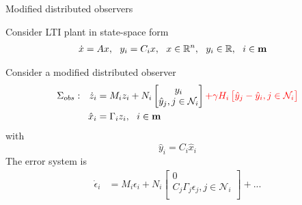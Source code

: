 \documentclass{beamer}
\newcommand{\R}{\mathbb{R}}
\begin{document}















\begin{frame}{\color{blue} Modified distributed observers}

Consider LTI plant in state-space form
\begin{align*}
\dot{x}&=A x,~~ y_{i}=C_{i}x,~~ x\in\R^{n},~~ y_{i}\in\R,~~ i\in{\bf m}
\end{align*}

Consider a modified distributed observer
\begin{align*}
\Sigma_{obs}:~~ \dot{z}_{i}&=M_{i}z_{i}+ N_{i}\begin{bmatrix} y_{i} \\ \hat{y}_{j},j\in\mathcal{N}_{i} \\ \end{bmatrix}
{\color{red}+\gamma H_{i}\begin{bmatrix} \hat{y}_{j}-\hat{y}_{i}, j\in\mathcal{N}_{i} \\ \end{bmatrix}} \\
\hat{x}_{i}&=\Gamma_{i}z_{i},~~ i\in{\bf m}
\end{align*}
with
\begin{equation*}
\hat{y}_{i}=C_{i}\hat{x}_{i}
\end{equation*}
The error system is
\begin{align*}
\dot{\epsilon}_{i}&=M_{i}\epsilon_{i} +N_{i}\begin{bmatrix} 0 \\ C_{j} \Gamma_{j}\epsilon_{j},j\in\mathcal{N}_{i} \\ \end{bmatrix} +...
\end{align*}

\end{frame}





\begin{frame}{\color{blue} }


\end{frame}


\begin{frame}{\color{blue} }


\end{frame}


\begin{frame}{\color{blue} }


\end{frame}
\end{document}
